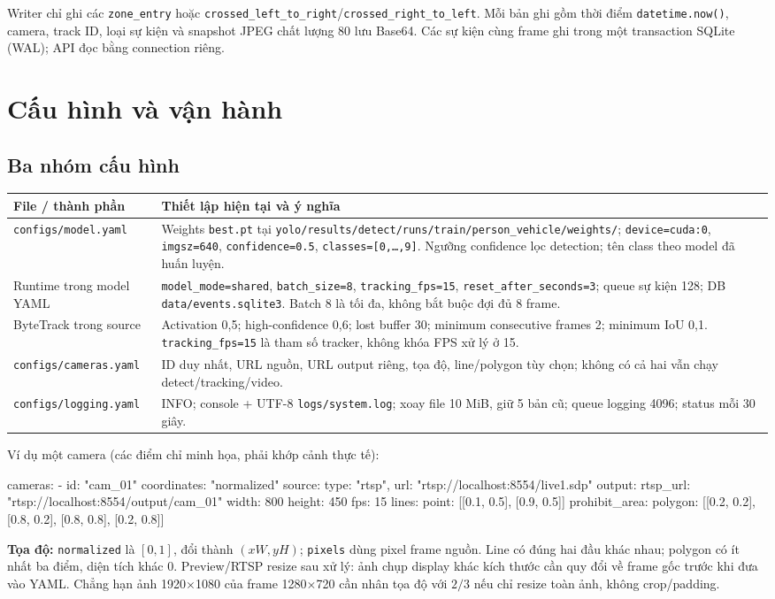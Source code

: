 \documentclass[10pt,a4paper]{article}
\begin{document}
Writer chỉ ghi các \texttt{zone\_entry} hoặc
\texttt{crossed\_left\_to\_right}/\texttt{crossed\_right\_to\_left}.
Mỗi bản ghi gồm thời điểm \texttt{datetime.now()}, camera, track ID, loại sự
kiện và snapshot JPEG chất lượng 80 lưu Base64. Các sự kiện cùng frame ghi
trong một transaction SQLite (WAL); API đọc bằng connection riêng.

\newpage
\section{Cấu hình và vận hành}
\subsection*{Ba nhóm cấu hình}
\begin{tabularx}{\linewidth}{@{}p{3.2cm}Y@{}}
\toprule
\textbf{File / thành phần} & \textbf{Thiết lập hiện tại và ý nghĩa}\\
\midrule
\texttt{configs/model.yaml} &
Weights \texttt{best.pt} tại
\texttt{yolo/results/detect/runs/train/person\_vehicle/weights/};
\texttt{device=cuda:0}, \texttt{imgsz=640}, \texttt{confidence=0.5},
\texttt{classes=[0,\ldots,9]}. Ngưỡng confidence lọc detection;
tên class theo model đã huấn luyện.\\
Runtime trong model YAML &
\texttt{model\_mode=shared}, \texttt{batch\_size=8},
\texttt{tracking\_fps=15}, \texttt{reset\_after\_seconds=3};
queue sự kiện 128; DB \texttt{data/events.sqlite3}.
Batch 8 là tối đa, không bắt buộc đợi đủ 8 frame.\\
ByteTrack trong source &
Activation 0,5; high-confidence 0,6; lost buffer 30;
minimum consecutive frames 2; minimum IoU 0,1.
\texttt{tracking\_fps=15} là tham số tracker, không khóa FPS xử lý ở 15.\\
\texttt{configs/cameras.yaml} &
ID duy nhất, URL nguồn, URL output riêng, tọa độ, line/polygon tùy chọn;
không có cả hai vẫn chạy detect/tracking/video.\\
\texttt{configs/logging.yaml} &
INFO; console + UTF-8 \texttt{logs/system.log}; xoay file 10 MiB,
giữ 5 bản cũ; queue logging 4096; status mỗi 30 giây.\\
\bottomrule
\end{tabularx}

Ví dụ một camera (các điểm chỉ minh họa, phải khớp cảnh thực tế):
\begin{Code}
cameras:
  - id: "cam_01"
    coordinates: "normalized"
    source: {type: "rtsp", url: "rtsp://localhost:8554/live1.sdp"}
    output:
      rtsp_url: "rtsp://localhost:8554/output/cam_01"
      width: 800
      height: 450
      fps: 15
    lines:
      point: [[0.1, 0.5], [0.9, 0.5]]
    prohibit_area:
      polygon: [[0.2, 0.2], [0.8, 0.2], [0.8, 0.8], [0.2, 0.8]]
\end{Code}
\textbf{Tọa độ:} \texttt{normalized} là $[0,1]$, đổi thành $(xW,yH)$;
\texttt{pixels} dùng pixel frame nguồn. Line có đúng hai đầu khác nhau;
polygon có ít nhất ba điểm, diện tích khác 0. Preview/RTSP resize sau xử lý:
ảnh chụp display khác kích thước cần quy đổi về frame gốc trước khi đưa vào YAML.
Chẳng hạn ảnh 1920$\times$1080 của frame 1280$\times$720 cần nhân tọa độ với $2/3$
nếu chỉ resize toàn ảnh, không crop/padding.
\end{document}
